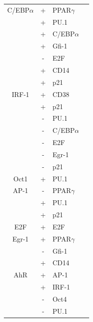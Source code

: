 \documentclass[12pt]{article}
\begin{document}
\begin{center}
\begin{scriptsize}
\begin{supertabular}{c|c|l|l}
\hline
C/EBP$\alpha$ &  + & PPAR$\gamma$ & \cite{Rosen2002}\\
 &  + & PU.1 & \cite{Dahl2003}\\
 &  + & C/EBP$\alpha$ & \cite{Timchenko1995}\\
 &  + & Gfi-1 & \cite{Lidonnici2010}\\
 &  - & E2F & \cite{DAlo2003}\\
 &  + & CD14 & \cite{Pan1999}\\
 &  + & p21 & \cite{Harris2001}\\
\hline
IRF-1 &  + & CD38 & \cite{Bauvois1999}\\
 &  + & p21 & \cite{Passioura2005}\\
 &  - & PU.1 & \cite{Dahl2007}\\
 &  - & C/EBP$\alpha$ & \cite{Duan2003}\\
 &  - & E2F & \cite{Duan2003}\\
 &  - & Egr-1 & \cite{Laslo2006}\\
 &  - & p21 & \cite{Duan2003}\\
\hline
Oct1 &  + & PU.1 & \cite{Chen1996}\\
\hline
AP-1 &  - & PPAR$\gamma$  & \cite{Delerive1999}\\
&  + & PU.1 &  \cite{Behre1999}\\
&  + & p21 &  \cite{Kardassis1999}\\
\hline
E2F &  + & E2F & \cite{Johnson1994}\\
\hline
Egr-1 &  + & PPAR$\gamma$ & \cite{Fu2002}\\
&  - & Gfi-1 & \cite{Mak2011}\\
&  + & CD14 & \cite{Chen2004}\\
\hline
AhR &  + & AP-1 & \cite{Suh2002}\\
&  + & IRF-1 & \cite{Shen2011}\\
& - & Oct4 & \cite{Bunaciu2011}\\
& - & PU.1 & \cite{Bock:2017aa} \\

\hline
\end{supertabular}
\end{scriptsize}
\end{center}

\clearpage
\end{document}
